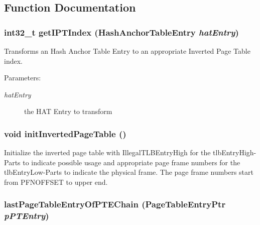 \subsection{Function Documentation}
\hypertarget{group___v_m_m___i_p_t_g84c6b60a0c0d560611edc86fd07a072f}{
\subsubsection[{getIPTIndex}]{\setlength{\rightskip}{0pt plus 5cm}int32\_\-t getIPTIndex ({\bf HashAnchorTableEntry} {\em hatEntry})}}
\label{group___v_m_m___i_p_t_g84c6b60a0c0d560611edc86fd07a072f}


Transforms an Hash Anchor Table Entry to an appropriate Inverted Page Table index. \begin{Desc}
\item[Parameters:]
\begin{description}
\item[{\em hatEntry}]the HAT Entry to transform \end{description}
\end{Desc}
\hypertarget{group___v_m_m___i_p_t_g633bd0e0b24708177aebf72079714748}{
\subsubsection[{initInvertedPageTable}]{\setlength{\rightskip}{0pt plus 5cm}void initInvertedPageTable ()}}
\label{group___v_m_m___i_p_t_g633bd0e0b24708177aebf72079714748}


Initialize the inverted page table with IllegalTLBEntryHigh for the tlbEntryHigh-Parts to indicate possible usage and appropriate page frame numbers for the tlbEntryLow-Parts to indicate the physical frame. The page frame numbers start from PFNOFFSET to upper end. \hypertarget{group___v_m_m___i_p_t_g5bf5d5affcca902498ae333f71928885}{
\subsubsection[{lastPageTableEntryOfPTEChain}]{ lastPageTableEntryOfPTEChain ({\bf PageTableEntryPtr} {\em pPTEntry})}}
\label{group___v_m_m___i_p_t_g5bf5d5affcca902498ae333f71928885}


